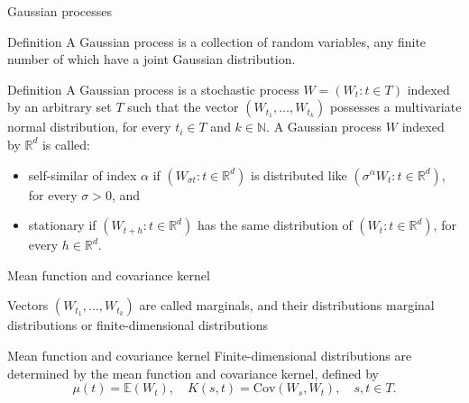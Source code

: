 \begin{frame}{Gaussian processes}
\begin{block}{Definition \citep{Rasmussen:2006aa}}
	A \alert{Gaussian process} is a collection of random variables, any finite number of which have a joint Gaussian distribution.
\end{block}

\pause

\begin{block}{Definition \citep{ghosal2017fundamentals}}
	A \alert{Gaussian process} is a stochastic process $W =(W_t: t \in T)$ indexed by an arbitrary set $T$ such that the vector $(W_{t_1},\ldots,W_{t_k})$ possesses a multivariate
normal distribution, for every $t_i\in T$ and $k\in \mathbb{N}$. A Gaussian process $W$ indexed by $\mathbb{R}^d$ is called:
\begin{itemize}
	\item  \alert{self-similar} of index $\alpha$ if $(W_{\sigma t}:t \in \mathbb{R}^d)$ is distributed like $(\sigma^\alpha W_{t}:t \in \mathbb{R}^d)$, for every $\sigma  > 0$, and 
	\item \alert{stationary} if $(W_{t+h}:t \in \mathbb{R}^d)$  has the same distribution of $(W_{t}:t \in \mathbb{R}^d)$, for every $h\in \mathbb{R}^d$.
\end{itemize}
\end{block}

\end{frame}



\begin{frame}{Mean function and covariance kernel}

Vectors $(W_{t_1},\ldots,W_{t_k})$ are called \alert{marginals}, and their distributions \alert{marginal distributions} or \alert{finite-dimensional distributions}

\pause


\begin{block}{Mean function and covariance kernel}
Finite-dimensional distributions are determined by the \alert{mean function} and \alert{covariance kernel}, defined by
$$\mu(t) = \mathbb{E}(W_t), \quad 
K(s, t) = \text{Cov}(W_s, W_t), \quad s, t \in  T.$$
\end{block}
\end{frame}



